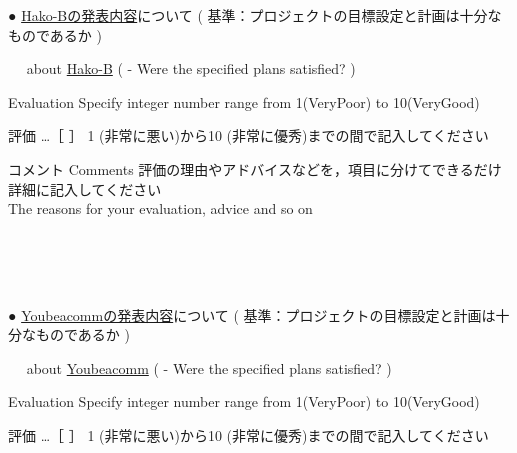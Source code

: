 \documentclass[a4,12pt]{jarticle}
\begin{document}
\begin{description}
\item{●} \underline{Hako-Bの発表内容}について
{\footnotesize ( 基準：プロジェクトの目標設定と計画は十分なものであるか )}
\vspace*{-4mm}
\item{　} about \underline{Hako-B}
{\footnotesize ( - Were the specified plans satisfied? )}
\begin{description}
\item{}  Evaluation \hspace{19mm}
{\footnotesize  Specify integer number range from {\normalsize 1}(VeryPoor)
to {\normalsize 10}(VeryGood)}
\vspace*{-3mm}
\item{}  評価 …［ \hspace{10mm} ］\hspace{5mm}
{\footnotesize {\normalsize 1} (非常に悪い)から{\normalsize 10} (非常に優秀)までの間で記入してください}
\vspace{-3mm}
\end{description}

\begin{itembox}[l]{コメント Comments}
\vspace*{-3mm} \hfill {\footnotesize
評価の理由やアドバイスなどを，項目に分けてできるだけ詳細に記入してください
} \vspace*{-2mm} \\
\hfill {\footnotesize The reasons for your evaluation, advice and so on}
\vspace{45mm}
\end{itembox}
\\ \\ \\

\item{●} \underline{Youbeacommの発表内容}について
{\footnotesize ( 基準：プロジェクトの目標設定と計画は十分なものであるか )}
\vspace*{-4mm}
\item{　} about \underline{Youbeacomm}
{\footnotesize ( - Were the specified plans satisfied? )}
\begin{description}
\item{}  Evaluation \hspace{19mm}
{\footnotesize  Specify integer number range from {\normalsize 1}(VeryPoor)
to {\normalsize 10}(VeryGood)}
\vspace*{-3mm}
\item{}  評価 …［ \hspace{10mm} ］\hspace{5mm}
{\footnotesize {\normalsize 1} (非常に悪い)から{\normalsize 10} (非常に優秀)までの間で記入してください}
\vspace{-3mm}
\end{description}


\end{description}
\end{document}
